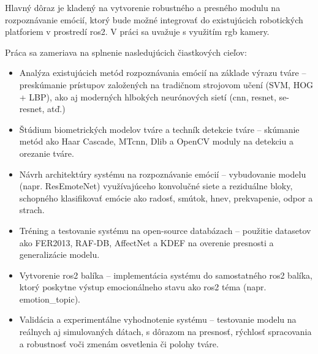 Hlavný dôraz je kladený na vytvorenie robustného a presného modulu na rozpoznávanie emócií, ktorý bude možné integrovať do existujúcich robotických platforiem v prostredí \gls{ros}2. 
V práci sa uvažuje s využitím \gls{rgb} kamery.

Práca sa zameriava na splnenie nasledujúcich čiastkových cieľov:

\begin{itemize}
    \item Analýza existujúcich metód rozpoznávania emócií na základe výrazu tváre – preskúmanie prístupov založených na tradičnom strojovom učení (SVM, HOG + LBP), ako aj moderných hlbokých neurónových sietí 
(\gls{cnn}, \gls{resnet}, \gls{se}-\gls{resnet}, atď.)

    \item Štúdium biometrických modelov tváre a techník detekcie tváre – skúmanie metód ako Haar Cascade, MT\gls{cnn}, Dlib a OpenCV moduly na detekciu a orezanie tváre.

    \item Návrh architektúry systému na rozpoznávanie emócií – vybudovanie modelu (napr. ResEmoteNet) využívajúceho konvolučné siete a reziduálne bloky, schopného klasifikovať emócie ako radosť, smútok, hnev, prekvapenie, 
odpor a strach.

    \item Tréning a testovanie systému na open-source databázach – použitie datasetov ako FER2013, RAF-DB, AffectNet a KDEF na overenie presnosti a generalizácie modelu.

    \item Vytvorenie \gls{ros}2 balíka – implementácia systému do samostatného \gls{ros}2 balíka, ktorý poskytne výstup emocionálneho stavu ako \gls{ros}2 téma (napr. emotion\_topic).

    \item Validácia a experimentálne vyhodnotenie systému – testovanie modelu na reálnych aj simulovaných dátach, s dôrazom na presnosť, rýchlosť spracovania a robustnosť voči zmenám osvetlenia či polohy tváre.
\end{itemize}

